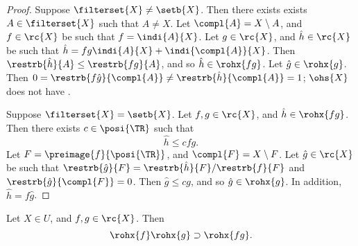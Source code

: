 \documentclass[b5paper, english, oneside]{memoir}
\begin{document}
\begin{proof}
\proofpart{$\implies$}
Suppose $\filterset{X} \neq \setb{X}$. Then there exists exists $A \in \filterset{X}$ such that $A \neq X$. Let $\compl{A} = X \setminus A$, and $f \in \rc{X}$ be such that $f = \indi{A}{X}$. Let $g \in \rc{X}$, and $\hat{h} \in \rc{X}$ be such that $\hat{h} = fg\indi{A}{X} + \indi{\compl{A}}{X}$. Then $\restrb{\hat{h}}{A} \leq \restrb{fg}{A}$, and so $\hat{h} \in \rohx{fg}$. Let $\hat{g} \in \rohx{g}$. Then $0 =\restrb{f \hat{g}}{\compl{A}} \neq \restrb{\hat{h}}{\compl{A}} = 1$; $\ohs{X}$ does not have .

\proofpart{$\impliedby$}
Suppose $\filterset{X} = \setb{X}$. Let $f, g \in \rc{X}$, and $\hat{h} \in \rohx{fg}$. Then there exists $c \in \posi{\TR}$ such that
\begin{equation}
\hat{h} \leq cfg.
\end{equation}
Let $F = \preimage{f}{\posi{\TR}}$, and $\compl{F} = X \setminus F$. Let $\hat{g} \in \rc{X}$ be such that $\restrb{\hat{g}}{F} = \restrb{\hat{h}}{F} / \restrb{f}{F}$ and $\restrb{\hat{g}}{\compl{F}} = 0$. Then $\hat{g} \leq cg$, and so $\hat{g} \in \rohx{g}$. In addition, $\hat{h} = f \hat{g}$. 
\end{proof}

\begin{theorem}
\label{LocalSuperMultiplicativity}
Let $X \in U$, and $f, g \in \rc{X}$. Then 
\begin{equation}
\rohx{f} \rohx{g} \supset \rohx{fg}.
\end{equation}
\end{theorem}
\end{document}
